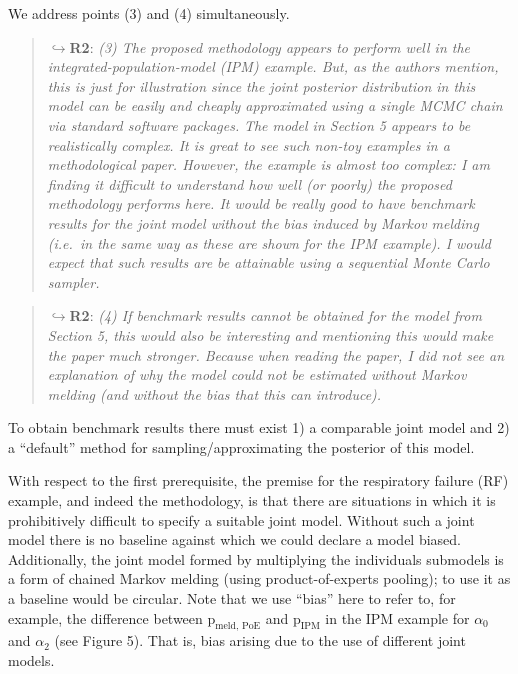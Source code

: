 \documentclass[
  10pt,
  a4paper,
]{article}
\newcommand{\pd}{\text{p}}
\begin{document}
\par

\noindent\hrulefill

\par

We address points (3) and (4) simultaneously.

\begin{quote}
\(\hookrightarrow\)\textbf{R2}: \emph{(3) The proposed methodology
appears to perform well in the integrated-population-model (IPM)
example. But, as the authors mention, this is just for illustration
since the joint posterior distribution in this model can be easily and
cheaply approximated using a single MCMC chain via standard software
packages.} \emph{The model in Section 5 appears to be realistically
complex. It is great to see such non-toy examples in a methodological
paper. However, the example is almost too complex: I am finding it
difficult to understand how well (or poorly) the proposed methodology
performs here. It would be really good to have benchmark results for the
joint model without the bias induced by Markov melding (i.e.~in the same
way as these are shown for the IPM example). I would expect that such
results are be attainable using a sequential Monte Carlo sampler.}
\end{quote}

\begin{quote}
\(\hookrightarrow\)\textbf{R2}: \emph{(4) If benchmark results cannot be
obtained for the model from Section 5, this would also be interesting
and mentioning this would make the paper much stronger. Because when
reading the paper, I did not see an explanation of why the model could
not be estimated without Markov melding (and without the bias that this
can introduce).}
\end{quote}

To obtain benchmark results there must exist 1) a comparable joint model
and 2) a ``default'' method for sampling/approximating the posterior of
this model.

With respect to the first prerequisite, the premise for the respiratory
failure (RF) example, and indeed the methodology, is that there are
situations in which it is prohibitively difficult to specify a suitable
joint model. Without such a joint model there is no baseline against
which we could declare a model biased. Additionally, the joint model
formed by multiplying the individuals submodels is a form of chained
Markov melding (using product-of-experts pooling); to use it as a
baseline would be circular. Note that we use ``bias'' here to refer to,
for example, the difference between \(\pd_{\text{meld, PoE}}\) and
\(\pd_{\text{IPM}}\) in the IPM example for \(\alpha_{0}\) and
\(\alpha_{2}\) (see Figure 5). That is, bias arising due to the use of
different joint models.
\end{document}
